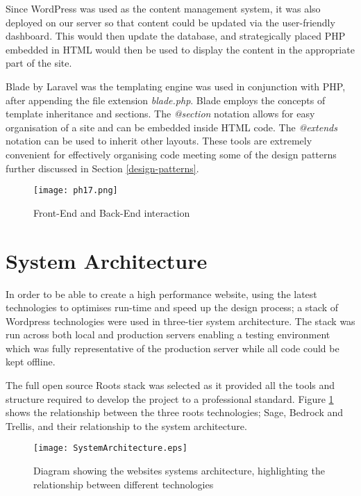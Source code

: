 \documentclass[fontsize=11pt]{extarticle}
\numberwithin{figure}{section} %
\begin{document}
Since WordPress was used as the content management system, it was also
deployed on our server so that content could be updated via the
user-friendly dashboard. This would then update the database, and
strategically placed PHP embedded in HTML would then be used to display
the content in the appropriate part of the site.

Blade by Laravel was the templating engine was used in conjunction with
PHP, after appending the file extension \emph{blade.php}. Blade employs
the concepts of template inheritance and sections. The \emph{@section}
notation allows for easy organisation of a site and can be embedded
inside HTML code. The \emph{@extends} notation can be used to inherit
other layouts. These tools are extremely convenient for effectively
organising code \cite{p18} meeting some of the design patterns further
discussed in Section \ref{design-patterns}.

\begin{figure}[H]
      \centering
      \texttt{[image: ph17.png]}
      \caption{Front-End and Back-End interaction}
 \end{figure}

\newpage

\hypertarget{system-architecture}{%
\section{System Architecture}\label{system-architecture}}

In order to be able to create a high performance website, using the
latest technologies to optimises run-time and speed up the design
process; a stack of Wordpress technologies were used in three-tier
system architecture. The stack was run across both local and production
servers enabling a testing environment which was fully representative of
the production server while all code could be kept offline.

The full open source Roots stack \cite{rootsweb} was selected as it
provided all the tools and structure required to develop the project to
a professional standard. Figure \ref{systemarchitecture} shows the
relationship between the three roots technologies; Sage, Bedrock and
Trellis, and their relationship to the system architecture.

\begin{figure}[H]
\centering
\texttt{[image: SystemArchitecture.eps]}
\caption{Diagram showing the websites systems architecture, highlighting the relationship between different technologies}
\label{systemarchitecture}
\end{figure}
\end{document}
